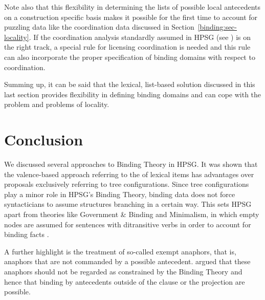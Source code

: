 \documentclass[output=paper
 	        ,biblatex
                ,babelshorthands
                ,newtxmath
                ,draftmode
                ,colorlinks, citecolor=brown
]{langscibook}
\begin{document}
Note also that this flexibility in determining the lists of possible local antecedents on a
construction specific basis makes it possible for the first time to account for puzzling data like
the coordination data discussed in Section~\ref{binding:sec-locality}. If the coordination analysis
standardly assumed in HPSG (see ) is on the right track, a special
rule for licensing coordination is needed and this rule can also incorporate the proper
specification of binding domains with respect to coordination.


Summing up, it can be said that the lexical, list-based solution discussed in this last section
provides flexibility in defining binding domains and can cope with the \iwithini problem and
problems of locality. 



\section{Conclusion}

We discussed several approaches to Binding Theory in HPSG. It was shown that the
valence-based approach referring to the \argstl of lexical items has advantages over proposals
exclusively referring to tree configurations. Since tree configurations play a minor role in HPSG's
Binding Theory, binding data does not force syntacticians to assume structures branching in a
certain way. This sets HPSG apart from theories like Government \& Binding and Minimalism, in which
empty nodes are assumed for sentences with ditransitive verbs in order to account for binding facts
\crossrefchapterp[\pageref{minimalism:page-binding-branching-start}--\pageref{minimalism:page-binding-branching-end}]{minimalism}. 

A further highlight is the treatment of so-called exempt anaphors, that is, anaphors that are not
commanded by a possible antecedent. \citet{PS92a}
argued that these anaphors should not be regarded
as constrained by the Binding Theory and hence that binding by antecedents outside of the clause or
the projection are possible.
\end{document}
